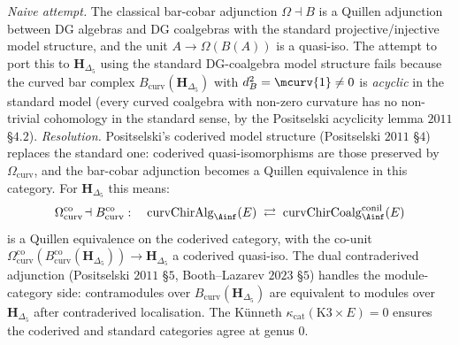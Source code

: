 \begin{proposition}
\label{prop:hochcalc-hdelta5-inversion-IV}
\emph{Naive attempt.} The classical bar-cobar adjunction
$\Omega\dashv B$ is a Quillen adjunction between DG algebras
and DG coalgebras with the standard projective/injective model
structure, and the unit
$A\to\Omega(B(A))$ is a quasi-iso. The attempt to port this to
$\mathbf H_{\Delta_5}$ using the standard DG-coalgebra model
structure fails because the curved bar complex
$B_{\mathrm{curv}}(\mathbf H_{\Delta_5})$ with $d_B^2=\mcurv{1}\ne 0$
is \emph{acyclic} in the standard model (every curved coalgebra
with non-zero curvature has no non-trivial cohomology in the
standard sense, by the Positselski acyclicity lemma
$2011$ \S$4.2$). \emph{Resolution.} Positselski's coderived model
structure (Positselski $2011$ \S$4$) replaces the standard one:
coderived quasi-isomorphisms are those preserved by
$\Omega_{\mathrm{curv}}$, and the bar-cobar adjunction becomes a
Quillen equivalence in this category. For $\mathbf H_{\Delta_5}$
this means:
\[
 \Omega_{\mathrm{curv}}^{\mathrm{co}}\!\dashv B_{\mathrm{curv}}^{\mathrm{co}}:
 \quad\mathrm{curvChirAlg}_{\Ainf}(E)\;\rightleftarrows\;
 \mathrm{curvChirCoalg}_{\Ainf}^{\mathrm{conil}}(E)
\]
is a Quillen equivalence on the coderived category, with the
co-unit $\Omega_{\mathrm{curv}}^{\mathrm{co}}(B_{\mathrm{curv}}^{\mathrm{co}}(\mathbf
H_{\Delta_5}))\to\mathbf H_{\Delta_5}$ a coderived quasi-iso.
The dual contraderived adjunction (Positselski $2011$ \S$5$,
Booth--Lazarev $2023$ \S$5$) handles the module-category side:
contramodules over $B_{\mathrm{curv}}(\mathbf H_{\Delta_5})$ are
equivalent to modules over $\mathbf H_{\Delta_5}$ after
contraderived localisation. The K\"unneth
$\kappa_{\mathrm{cat}}(\mathrm K3\times E)=0$ ensures the
coderived and standard categories agree at genus $0$.
\end{proposition}

